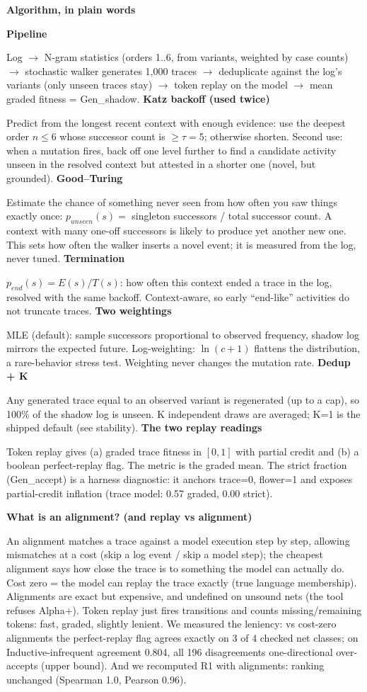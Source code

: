 \documentclass[10pt,twocolumn]{article}
\newcommand{\hdr}[1]{\vspace{5pt}\noindent\textcolor{hd}{\textbf{\large #1}}\par\vspace{2pt}}
\newcommand{\sub}[1]{\vspace{3pt}\noindent\textbf{#1}\par}
\begin{document}
\hdr{Algorithm, in plain words}
\sub{Pipeline}
Log $\to$ N-gram statistics (orders 1..6, from variants, weighted by case counts) $\to$ stochastic walker generates 1{,}000 traces $\to$ deduplicate against the log's variants (only unseen traces stay) $\to$ token replay on the model $\to$ mean graded fitness = Gen\_shadow.
\sub{Katz backoff (used twice)}
Predict from the longest recent context with enough evidence: use the deepest order $n\le6$ whose successor count is $\ge\tau{=}5$; otherwise shorten. Second use: when a mutation fires, back off one level further to find a candidate activity unseen in the resolved context but attested in a shorter one (novel, but grounded).
\sub{Good--Turing}
Estimate the chance of something never seen from how often you saw things exactly once: $p_{unseen}(s)=$ singleton successors / total successor count. A context with many one-off successors is likely to produce yet another new one. This sets how often the walker inserts a novel event; it is measured from the log, never tuned.
\sub{Termination}
$p_{end}(s)=E(s)/T(s)$: how often this context ended a trace in the log, resolved with the same backoff. Context-aware, so early ``end-like'' activities do not truncate traces.
\sub{Two weightings}
MLE (default): sample successors proportional to observed frequency, shadow log mirrors the expected future. Log-weighting: $\ln(c{+}1)$ flattens the distribution, a rare-behavior stress test. Weighting never changes the mutation rate.
\sub{Dedup + K}
Any generated trace equal to an observed variant is regenerated (up to a cap), so 100\% of the shadow log is unseen. K independent draws are averaged; K=1 is the shipped default (see stability).
\sub{The two replay readings}
Token replay gives (a) graded trace fitness in $[0,1]$ with partial credit and (b) a boolean perfect-replay flag. The metric is the graded mean. The strict fraction (Gen\_accept) is a harness diagnostic: it anchors trace=0, flower=1 and exposes partial-credit inflation (trace model: 0.57 graded, 0.00 strict).

\hdr{What is an alignment? (and replay vs alignment)}
An alignment matches a trace against a model execution step by step, allowing mismatches at a cost (skip a log event / skip a model step); the cheapest alignment says how close the trace is to something the model can actually do. Cost zero = the model can replay the trace exactly (true language membership). Alignments are exact but expensive, and undefined on unsound nets (the tool refuses Alpha+). Token replay just fires transitions and counts missing/remaining tokens: fast, graded, slightly lenient. We measured the leniency: vs cost-zero alignments the perfect-replay flag agrees exactly on 3 of 4 checked net classes; on Inductive-infrequent agreement 0.804, all 196 disagreements one-directional over-accepts (upper bound). And we recomputed R1 with alignments: ranking unchanged (Spearman 1.0, Pearson 0.96).
\end{document}
